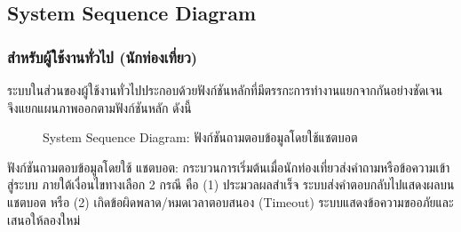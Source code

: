 \clearpage
\subsection{System Sequence Diagram}

\subsubsection{สำหรับผู้ใช้งานทั่วไป (นักท่องเที่ยว)}

ระบบในส่วนของผู้ใช้งานทั่วไปประกอบด้วยฟังก์ชันหลักที่มีตรรกะการทำงานแยกจากกันอย่างชัดเจน จึงแยกแผนภาพออกตามฟังก์ชันหลัก ดังนี้

\begin{figure}[H]
\centering
{}
\caption{System Sequence Diagram: ฟังก์ชันถามตอบข้อมูลโดยใช้แชตบอต}
\label{fig:ssd_tourist_chatbot}
\end{figure}

ฟังก์ชันถามตอบข้อมูลโดยใช้ แชตบอต: กระบวนการเริ่มต้นเมื่อนักท่องเที่ยวส่งคำถามหรือข้อความเข้าสู่ระบบ ภายใต้เงื่อนไขทางเลือก 2 กรณี คือ (1) ประมวลผลสำเร็จ ระบบส่งคำตอบกลับไปแสดงผลบนแชตบอต หรือ (2) เกิดข้อผิดพลาด/หมดเวลาตอบสนอง (Timeout) ระบบแสดงข้อความขออภัยและเสนอให้ลองใหม่

